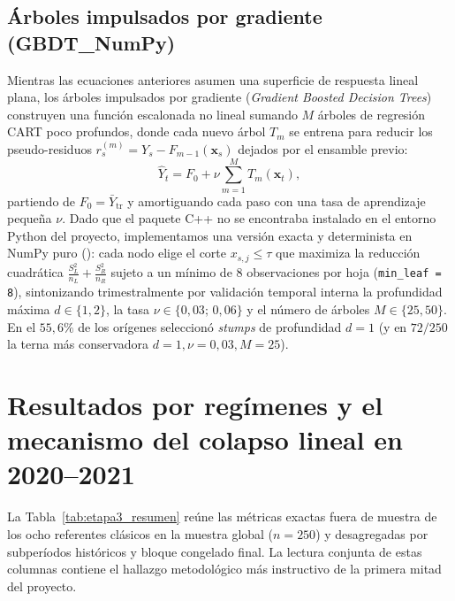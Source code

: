 \documentclass[12pt,letterpaper]{article}
\begin{document}
\subsection{Árboles impulsados por gradiente (GBDT\_NumPy)}

Mientras las ecuaciones anteriores asumen una superficie de respuesta lineal plana, los árboles impulsados por gradiente (\emph{Gradient Boosted Decision Trees}) \parencite{friedman2001} construyen una función escalonada no lineal sumando \(M\) árboles de regresión CART poco profundos, donde cada nuevo árbol \(T_m\) se entrena para reducir los pseudo-residuos \(r_s^{(m)} = Y_s - F_{m-1}(\mathbf{x}_s)\) dejados por el ensamble previo:
\begin{equation}
  \widehat{Y}_t = F_0 + \nu \sum_{m=1}^{M} T_m(\mathbf{x}_t),
  \label{eq:gbdt}
\end{equation}
partiendo de \(F_0 = \bar{Y}_{\text{tr}}\) y amortiguando cada paso con una tasa de aprendizaje pequeña \(\nu\). Dado que el paquete C++  no se encontraba instalado en el entorno Python del proyecto, implementamos una versión exacta y determinista en NumPy puro (): cada nodo elige el corte \(x_{s,j} \le \tau\) que maximiza la reducción cuadrática \(\frac{S_L^2}{n_L} + \frac{S_R^2}{n_R}\) sujeto a un mínimo de \(8\) observaciones por hoja (\texttt{min\_leaf = 8}), sintonizando trimestralmente por validación temporal interna la profundidad máxima \(d \in \{1, 2\}\), la tasa \(\nu \in \{0{,}03;\, 0{,}06\}\) y el número de árboles \(M \in \{25, 50\}\). En el \(55{,}6\%\) de los orígenes seleccionó \emph{stumps} de profundidad \(d = 1\) (y en \(72/250\) la terna más conservadora \(d=1, \nu=0{,}03, M=25\)).

\section{Resultados por regímenes y el mecanismo del colapso lineal en 2020--2021}

La Tabla~\ref{tab:etapa3_resumen} reúne las métricas exactas fuera de muestra de los ocho referentes clásicos en la muestra global (\(n=250\)) y desagregadas por subperíodos históricos y bloque congelado final. La lectura conjunta de estas columnas contiene el hallazgo metodológico más instructivo de la primera mitad del proyecto.
\end{document}
